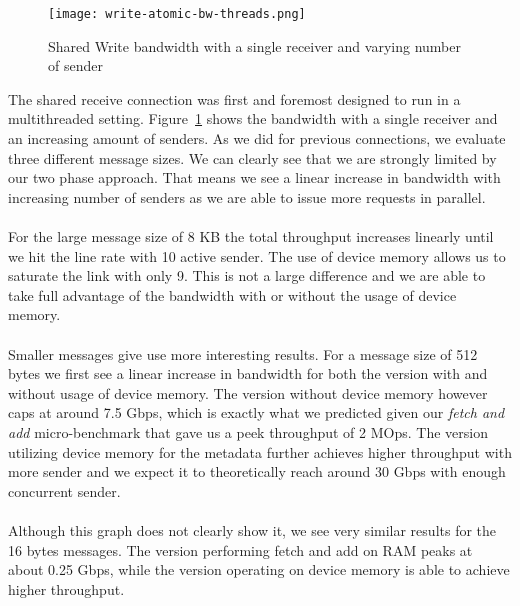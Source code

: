 \begin{figure}[h]
\texttt{[image: write-atomic-bw-threads.png]}
\caption{Shared Write bandwidth with a single receiver and varying number of sender}
\label{fig:plot-write-atomic-n1}
\end{figure}

The shared receive connection was first and foremost designed to run in a multithreaded setting. 
Figure~\ref{fig:plot-write-atomic-n1} shows the bandwidth with a single receiver and an increasing amount of senders. As we 
did for previous connections, we evaluate three different message sizes. We can clearly see that we are strongly limited by
our two phase approach. That means we see a linear increase in bandwidth with increasing number of senders as we are able to
issue more requests in parallel.

\paragraph{} For the large message size of 8 KB the total throughput increases linearly until we hit the line rate with 10 
active sender. The use of device memory allows us to saturate the link with only 9. This is not a large difference and we are
able to take full advantage of the bandwidth with or without the usage of device memory.

\paragraph{} Smaller messages give use more interesting results. For a message size of 512 bytes we first see a linear 
increase in bandwidth for both the version with and without usage of device memory. The version without device memory however
caps at around 7.5 Gbps, which is exactly what we predicted given our \emph{fetch and add} micro-benchmark that gave us a
peek throughput of 2 MOps. The version utilizing device memory for the metadata further achieves higher throughput with more
sender and we expect it to theoretically reach around 30 Gbps with enough concurrent sender.

\paragraph{} Although this graph does not clearly show it, we see very similar results for the 16 bytes messages. The version
performing fetch and add on RAM peaks at about 0.25 Gbps, while the version operating on device memory is able to achieve 
higher throughput.


